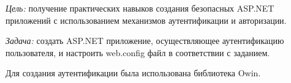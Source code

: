 \documentclass[pscyr]{hedlab}
\begin{document}
    \makeheader
    \emph{Цель:} получение практических навыков создания безопасных ASP.NET приложений с 
    использованием механизмов аутентификации и авторизации.
    
    \emph{Задача:} создать ASP.NET приложение, осуществляющее аутентификацию
      пользователя, и настроить web.config файл в соответствии с заданием.

    Для создания аутентификации была использована библиотека Owin.
    
    
    
    
    
    

    

    \pagebreak
\end{document}
